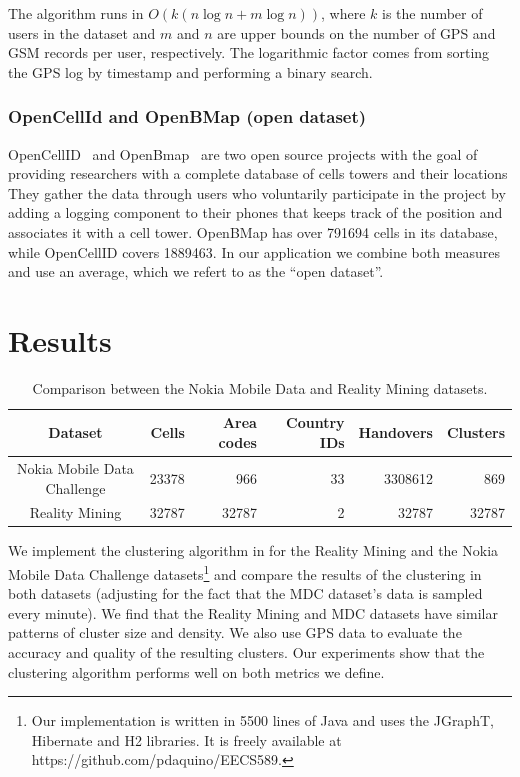 \documentclass[letterpaper, 12pt, conference]{ieeeconf}
\begin{document}
The algorithm runs in $O(k(n\log n + m\log n))$, where $k$ is the number of 
users in the dataset and $m$ and $n$ are upper bounds on the number of GPS 
and GSM records per user, respectively. The logarithmic factor comes from 
sorting the GPS log by timestamp and performing a binary search.

\subsubsection{OpenCellId and OpenBMap (open dataset)}

OpenCellID~\cite{openCellId} and OpenBmap~\cite{openBMap} are two open source 
projects with the goal of providing researchers with a complete database of 
cells towers and their locations They gather the data through users who 
voluntarily participate in the project by adding a logging component to their 
phones that keeps track of the position and associates it with a cell tower. 
OpenBMap has over 791694 cells in its database, while OpenCellID covers 
1889463. In our application we combine both measures and use an average, 
which we refert to as the ``open dataset''.

\section{Results}
\label{sec:results}

\begin{table}
    \centering
    \begin{tabular}{ | c || r | r | r | r | r | }
    \hline
    Dataset & Cells  & Area codes & Country IDs & Handovers & Clusters \\
    \hline
    Nokia Mobile Data Challenge & 23378 & 966 & 33 & 3308612 & 869 \\
    \hline
    Reality Mining & 32787 & 32787 & 2 & 32787 & 32787 \\
    \hline
    \end{tabular}
\caption{Comparison between the Nokia Mobile Data and Reality Mining datasets.}
\label{tbl:datasetComparison}
\end{table}


We implement the clustering algorithm in \cite{mobilityprofiler} for the 
Reality Mining and the Nokia Mobile Data Challenge datasets\footnote{Our implementation is written in 5500 lines of Java and uses the JGraphT, Hibernate and H2 libraries. It is freely available at https://github.com/pdaquino/EECS589.} and compare 
the results of the clustering in both datasets (adjusting for the fact that 
the MDC dataset's data is sampled every minute). We find that the Reality Mining and MDC datasets have similar 
patterns of cluster size and density. We also use GPS data to evaluate the 
accuracy and quality of the resulting clusters. Our experiments show that the 
clustering algorithm performs well on both metrics we define.
\end{document}
